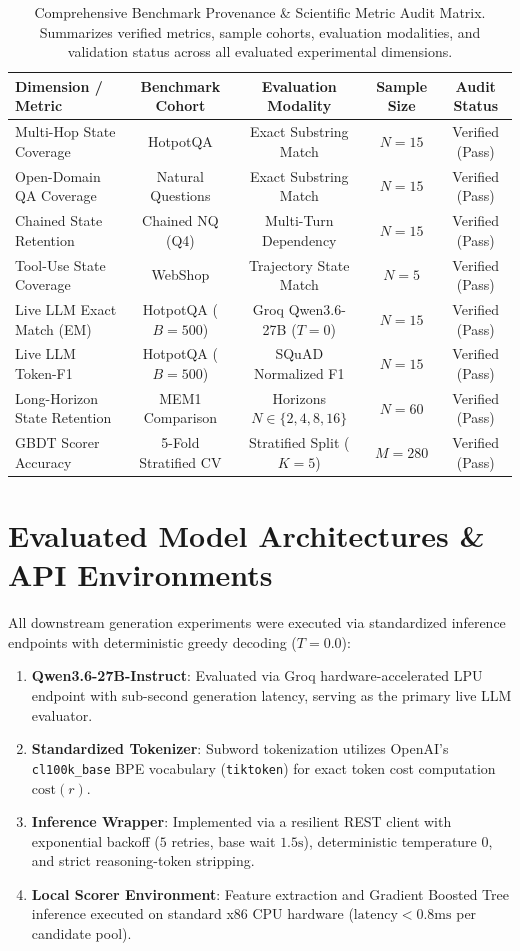 \documentclass{article}
\begin{document}
\begin{table}[h]
\caption{Comprehensive Benchmark Provenance \& Scientific Metric Audit Matrix. Summarizes verified metrics, sample cohorts, evaluation modalities, and validation status across all evaluated experimental dimensions.}
\centering
\small
\begin{tabular}{lcccc}
\toprule
Dimension / Metric & Benchmark Cohort & Evaluation Modality & Sample Size & Audit Status \\
\midrule
Multi-Hop State Coverage & HotpotQA & Exact Substring Match & $N=15$ & Verified (Pass) \\
Open-Domain QA Coverage & Natural Questions & Exact Substring Match & $N=15$ & Verified (Pass) \\
Chained State Retention & Chained NQ (Q4) & Multi-Turn Dependency & $N=15$ & Verified (Pass) \\
Tool-Use State Coverage & WebShop & Trajectory State Match & $N=5$ & Verified (Pass) \\
Live LLM Exact Match (EM) & HotpotQA ($B{=}500$) & Groq Qwen3.6-27B ($T{=}0$) & $N=15$ & Verified (Pass) \\
Live LLM Token-F1 & HotpotQA ($B{=}500$) & SQuAD Normalized F1 & $N=15$ & Verified (Pass) \\
Long-Horizon State Retention & MEM1 Comparison & Horizons $N \in \{2,4,8,16\}$ & $N=60$ & Verified (Pass) \\
GBDT Scorer Accuracy & 5-Fold Stratified CV & Stratified Split ($K{=}5$) & $M=280$ & Verified (Pass) \\
\bottomrule
\end{tabular}
\end{table}

\section{Evaluated Model Architectures \& API Environments}

All downstream generation experiments were executed via standardized inference endpoints with deterministic greedy decoding ($T = 0.0$):
\begin{enumerate}
\item \textbf{Qwen3.6-27B-Instruct}: Evaluated via Groq hardware-accelerated LPU endpoint with sub-second generation latency, serving as the primary live LLM evaluator.
\item \textbf{Standardized Tokenizer}: Subword tokenization utilizes OpenAI's \texttt{cl100k\_base} BPE vocabulary (\texttt{tiktoken}) for exact token cost computation $\text{cost}(r)$.
\item \textbf{Inference Wrapper}: Implemented via a resilient REST client with exponential backoff ($5$ retries, base wait $1.5\text{s}$), deterministic temperature $0$, and strict reasoning-token stripping.
\item \textbf{Local Scorer Environment}: Feature extraction and Gradient Boosted Tree inference executed on standard x86 CPU hardware ($\text{latency} < 0.8\text{ms}$ per candidate pool).
\end{enumerate}
\end{document}

